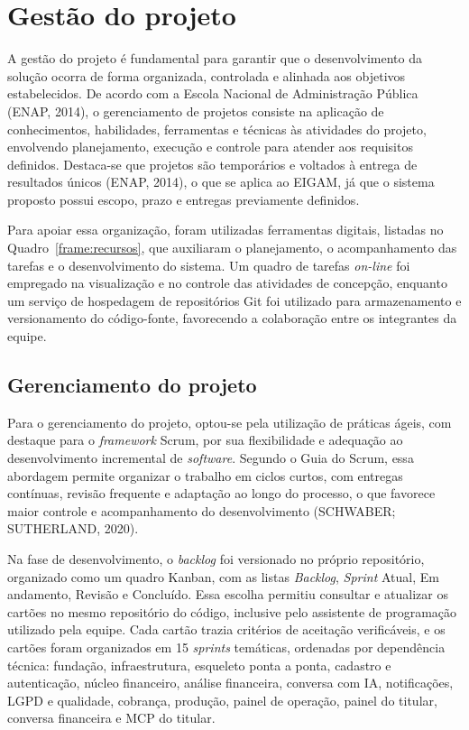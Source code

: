\chapter{Gestão do projeto}

A gestão do projeto é fundamental para garantir que o desenvolvimento da solução ocorra de forma organizada, controlada e alinhada aos objetivos estabelecidos. De acordo com a Escola Nacional de Administração Pública (ENAP, 2014), o gerenciamento de projetos consiste na aplicação de conhecimentos, habilidades, ferramentas e técnicas às atividades do projeto, envolvendo planejamento, execução e controle para atender aos requisitos definidos. Destaca-se que projetos são temporários e voltados à entrega de resultados únicos (ENAP, 2014), o que se aplica ao EIGAM, já que o sistema proposto possui escopo, prazo e entregas previamente definidos.

Para apoiar essa organização, foram utilizadas ferramentas digitais, listadas no Quadro~\ref{frame:recursos}, que auxiliaram o planejamento, o acompanhamento das tarefas e o desenvolvimento do sistema. Um quadro de tarefas \textit{on-line} foi empregado na visualização e no controle das atividades de concepção, enquanto um serviço de hospedagem de repositórios Git foi utilizado para armazenamento e versionamento do código-fonte, favorecendo a colaboração entre os integrantes da equipe.

\section{Gerenciamento do projeto}

Para o gerenciamento do projeto, optou-se pela utilização de práticas ágeis, com destaque para o \textit{framework} Scrum, por sua flexibilidade e adequação ao desenvolvimento incremental de \textit{software}. Segundo o Guia do Scrum, essa abordagem permite organizar o trabalho em ciclos curtos, com entregas contínuas, revisão frequente e adaptação ao longo do processo, o que favorece maior controle e acompanhamento do desenvolvimento (SCHWABER; SUTHERLAND, 2020).

Na fase de desenvolvimento, o \textit{backlog} foi versionado no próprio repositório, organizado como um quadro Kanban, com as listas \textit{Backlog}, \textit{Sprint} Atual, Em andamento, Revisão e Concluído. Essa escolha permitiu consultar e atualizar os cartões no mesmo repositório do código, inclusive pelo assistente de programação utilizado pela equipe. Cada cartão trazia critérios de aceitação verificáveis, e os cartões foram organizados em 15 \textit{sprints} temáticas, ordenadas por dependência técnica: fundação, infraestrutura, esqueleto ponta a ponta, cadastro e autenticação, núcleo financeiro, análise financeira, conversa com IA, notificações, LGPD e qualidade, cobrança, produção, painel de operação, painel do titular, conversa financeira e MCP do titular.

